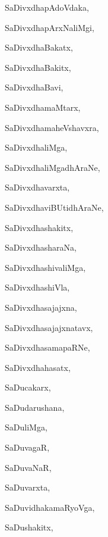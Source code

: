 \begin{multicols}{3}
{\noindent
{SaDivxdhapAdoVdaka}, \pageref{SaDivxdhapAdoVdaka}

\noindent
{SaDivxdhapArxNaliMgi}, \pageref{SaDivxdhapArxNaliMgi}

\noindent
{SaDivxdhaBakatx}, \pageref{SaDivxdhaBakatx}

\noindent
{SaDivxdhaBakitx}, \pageref{SaDivxdhaBakitx}

\noindent
{SaDivxdhaBavi}, \pageref{SaDivxdhaBavi}

\noindent
{SaDivxdhamaMtarx}, \pageref{SaDivxdhamaMtarx}

\noindent
{SaDivxdhamaheVshavxra}, \pageref{SaDivxdhamaheVshavxra}

\noindent
{SaDivxdhaliMga}, \pageref{SaDivxdhaliMga}

\noindent
{SaDivxdhaliMgadhAraNe}, \pageref{SaDivxdhaliMgadhAraNe}

\noindent
{SaDivxdhavarxta}, \pageref{SaDivxdhavarxta}

\noindent
{SaDivxdhaviBUtidhAraNe}, \pageref{SaDivxdhaviBUtidhAraNe}

\noindent
{SaDivxdhashakitx}, \pageref{SaDivxdhashakitx}

\noindent
{SaDivxdhasharaNa}, \pageref{SaDivxdhasharaNa}

\noindent
{SaDivxdhashivaliMga}, \pageref{SaDivxdhashivaliMga}

\noindent
{SaDivxdhashiVla}, \pageref{SaDivxdhashiVla}

\noindent
{SaDivxdhasajajxna}, \pageref{SaDivxdhasajajxna}

\noindent
{SaDivxdhasajajxnatavx}, \pageref{SaDivxdhasajajxnatavx}

\noindent
{SaDivxdhasamapaRNe}, \pageref{SaDivxdhasamapaRNe}

\noindent
{SaDivxdhahasatx}, \pageref{SaDivxdhahasatx}

\noindent
{SaDucakarx}, \pageref{SaDucakarx}

\noindent
{SaDudarushana}, \pageref{SaDudarushana}

\noindent
{SaDuliMga}, \pageref{SaDuliMga}

\noindent
{SaDuvagaR}, \pageref{SaDuvagaR}

\noindent
{SaDuvaNaR}, \pageref{SaDuvaNaR}

\noindent
{SaDuvarxta}, \pageref{SaDuvarxta}

\noindent
{SaDuvidhakamaRyoVga}, \pageref{SaDuvidhakamaRyoVga}

\noindent
{SaDushakitx}, \pageref{SaDushakitx}

}
\end{multicols}
